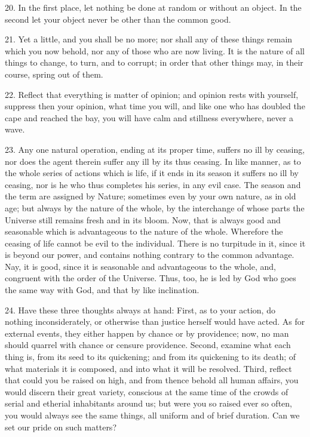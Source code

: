 \documentclass{book}
\begin{document}
20. In the first place, let nothing be done at random or without an
object. In the second let your object never be other than the common
good.

21. Yet a little, and you shall be no more; nor shall any of these
things remain which you now behold, nor any of those who are now
living. It is the nature of all things to change, to turn, and to
corrupt; in order that other things may, in their course, spring out
of them.

22. Reflect that everything is matter of opinion; and opinion rests
with yourself, suppress then your opinion, what time you will, and
like one who has doubled the cape and reached the bay, you will have
calm and stillness everywhere, never a wave.

23. Any one natural operation, ending at its proper time, suffers no
ill by ceasing, nor does the agent therein suffer any ill by its thus
ceasing. In like manner, as to the whole series of actions which is
life, if it ends in its season it suffers no ill by ceasing, nor is he
who thus completes his series, in any evil case. The season and the
term are assigned by Nature; sometimes even by your own nature, as in
old age; but always by the nature of the whole, by the interchange of
whose parts the Universe still remains fresh and in its bloom. Now,
that is always good and seasonable which is advantageous to the nature
of the whole. Wherefore the ceasing of life cannot be evil to the
individual. There is no turpitude in it, since it is beyond our power,
and contains nothing contrary to the common advantage. Nay, it is
good, since it is seasonable and advantageous to the whole, and,
congruent with the order of the Universe. Thus, too, he is led by God
who goes the same way with God, and that by like inclination.

24. Have these three thoughts always at hand: First, as to your
action, do nothing inconsiderately, or otherwise than justice herself
would have acted. As for external events, they either happen by chance
or by providence; now, no man should quarrel with chance or censure
providence. Second, examine what each thing is, from its seed to its
quickening; and from its quickening to its death; of what materials it
is composed, and into what it will be resolved. Third, reflect that
could you be raised on high, and from thence behold all human affairs,
you would discern their great variety, conscious at the same time of
the crowds of serial and etherial inhabitants around us; but were you
so raised ever so often, you would always see the same things, all
uniform and of brief duration. Can we set our pride on such matters?
\end{document}
